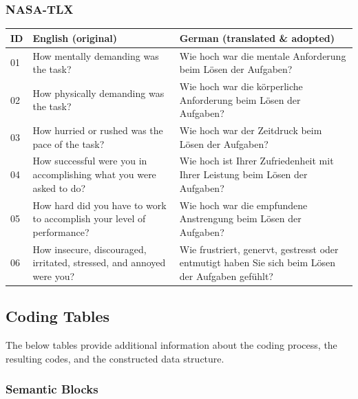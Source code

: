\clearpage
\subsubsection*{\ac{NASA}-\ac{TLX}}

\begin{ctable}
    \begin{tabularx}{\textwidth}{l X X}
        \toprule
        \textbf{ID} & \textbf{English} (original) & \textbf{German} (translated \& adopted) \\
        \midrule
        01 & How mentally demanding was the task? & Wie hoch war die mentale Anforderung beim Lösen der Aufgaben? \\
        02 & How physically demanding was the task? & Wie hoch war die körperliche Anforderung beim Lösen der Aufgaben? \\
        03 & How hurried or rushed was the pace of the task? & Wie hoch war der Zeitdruck beim Lösen der Aufgaben? \\
        04 & How successful were you in accomplishing what you were asked to do? & Wie hoch ist Ihrer Zufriedenheit mit Ihrer Leistung beim Lösen der Aufgaben? \\
        05 & How hard did you have to work to accomplish your level of performance? & Wie hoch war die empfundene Anstrengung beim Lösen der Aufgaben? \\
        06 & How insecure, discouraged, irritated, stressed, and annoyed were you? & Wie frustriert, genervt, gestresst oder entmutigt haben Sie sich beim Lösen der Aufgaben gefühlt? \\
        \bottomrule
    \end{tabularx}
\end{ctable}


\clearpage
\subsection*{Coding Tables}

The below tables provide additional information about the coding process, the resulting codes, and the constructed data structure.

\subsubsection*{Semantic Blocks}

